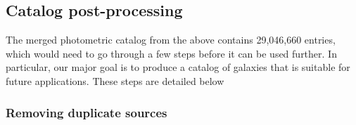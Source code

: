 \documentclass[apj,iop]{emulateapj}
\begin{document}


\subsection{Catalog post-processing}

The merged photometric catalog from the above contains 29,046,660 entries, which would need to go through a few steps before it can be used further. In particular, our major goal is to produce a catalog of galaxies that is suitable for future applications. These steps are detailed below

\subsubsection{Removing duplicate sources}
\end{document}
